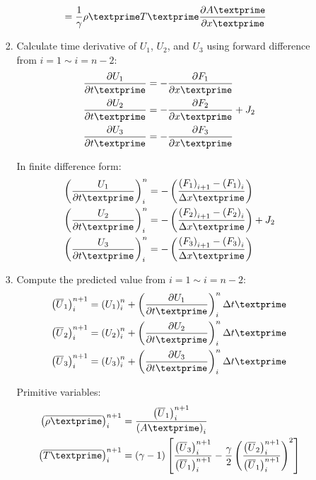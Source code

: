 \documentclass[12pt]{article}
\begin{document}
\begin{enumerate}
\begin{enumerate}
\begin{enumerate}
\begin{align}
						&= \frac{1}{\gamma}\rho\textprime T\textprime\frac{\partial A\textprime}{\partial x\textprime}
				\end{align}
			\item Calculate time derivative of $U_1$, $U_2$, and $U_3$ using forward difference from $i = 1 \sim i = n - 2$:
				\begin{align}
					\frac{\partial U_1}{\partial t\textprime} &= - \frac{\partial F_1}{\partial x\textprime}\\
					\frac{\partial U_2}{\partial t\textprime} &= - \frac{\partial F_2}{\partial x\textprime} + J_2 \\
					\frac{\partial U_3}{\partial t\textprime} &= - \frac{\partial F_3}{\partial x\textprime}
				\end{align}
				\par In finite difference form:
				\begin{align}
					\left(\frac{U_1}{\partial t\textprime}\right)_{i}^{n} &= -\left(\frac{\left(F_{1}\right)_{i+1} - \left(F_{1}\right)_{i}}{\Delta x\textprime}\right) \\
					\left(\frac{U_2}{\partial t\textprime}\right)_{i}^{n} &= -\left(\frac{\left(F_{2}\right)_{i+1} - \left(F_{2}\right)_{i}}{\Delta x\textprime}\right) + J_2 \\
					\left(\frac{U_3}{\partial t\textprime}\right)_{i}^{n} &= -\left(\frac{\left(F_{3}\right)_{i+1} - \left(F_{3}\right)_{i}}{\Delta x\textprime}\right)
				\end{align}

			\item Compute the predicted value from $i = 1 \sim i = n - 2$:
				\begin{align}
					\left(\overline{U}_{1}\right)_{i}^{n+1} &= \left(U_{1}\right)_{i}^{n} + \left(\frac{\partial U_{1}}{\partial t\textprime}\right)_{i}^{n}\Delta t\textprime \\
					\left(\overline{U}_{2}\right)_{i}^{n+1} &= \left(U_{2}\right)_{i}^{n} + \left(\frac{\partial U_{2}}{\partial t\textprime}\right)_{i}^{n}\Delta t\textprime \\
					\left(\overline{U}_{3}\right)_{i}^{n+1} &= \left(U_{3}\right)_{i}^{n} + \left(\frac{\partial U_{3}}{\partial t\textprime}\right)_{i}^{n}\Delta t\textprime 
				\end{align}
				\par Primitive variables:
				\begin{align}
					\left(\overline{\rho\textprime}\right)_{i}^{n+1} &= \frac{\left(\overline{U}_{1}\right)_{i}^{n+1}}{\left(A\textprime\right)_{i}} \\
					\left(\overline{T\textprime}\right)_{i}^{n+1} &= \left(\gamma - 1\right)\left[\frac{\left(\overline{U}_3\right)_{i}^{n+1}}{\left(\overline{U}_1\right)_{i}^{n+1}} - \frac{\gamma}{2}\left(\frac{\left(\overline{U}_2\right)_{i}^{n+1}}{\left(\overline{U}_1\right)_{i}^{n+1}}\right)^2\right]
				\end{align}


\end{enumerate}
\end{enumerate}
\end{enumerate}
\end{document}
